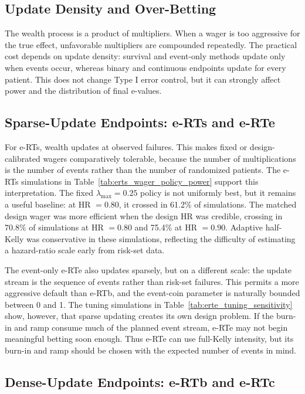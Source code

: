 \documentclass[10pt]{article}
\begin{document}
\subsection{Update Density and Over-Betting}

The wealth process is a product of multipliers. When a wager is too aggressive for the true effect, unfavorable multipliers are compounded repeatedly. The practical cost depends on update density: survival and event-only methods update only when events occur, whereas binary and continuous endpoints update for every patient. This does not change Type I error control, but it can strongly affect power and the distribution of final e-values.

\subsection{Sparse-Update Endpoints: e-RTs and e-RTe}

For e-RTs, wealth updates at observed failures. This makes fixed or design-calibrated wagers comparatively tolerable, because the number of multiplications is the number of events rather than the number of randomized patients. The e-RTs simulations in Table~\ref{tab:erts_wager_policy_power} support this interpretation. The fixed $\lambda_{\max}=0.25$ policy is not uniformly best, but it remains a useful baseline: at HR $=0.80$, it crossed in 61.2\% of simulations. The matched design wager was more efficient when the design HR was credible, crossing in 70.8\% of simulations at HR $=0.80$ and 75.4\% at HR $=0.90$. Adaptive half-Kelly was conservative in these simulations, reflecting the difficulty of estimating a hazard-ratio scale early from risk-set data.

The event-only e-RTe also updates sparsely, but on a different scale: the update stream is the sequence of events rather than risk-set failures. This permits a more aggressive default than e-RTb, and the event-coin parameter is naturally bounded between 0 and 1. The tuning simulations in Table~\ref{tab:erte_tuning_sensitivity} show, however, that sparse updating creates its own design problem. If the burn-in and ramp consume much of the planned event stream, e-RTe may not begin meaningful betting soon enough. Thus e-RTe can use full-Kelly intensity, but its burn-in and ramp should be chosen with the expected number of events in mind.

\subsection{Dense-Update Endpoints: e-RTb and e-RTc}
\end{document}
